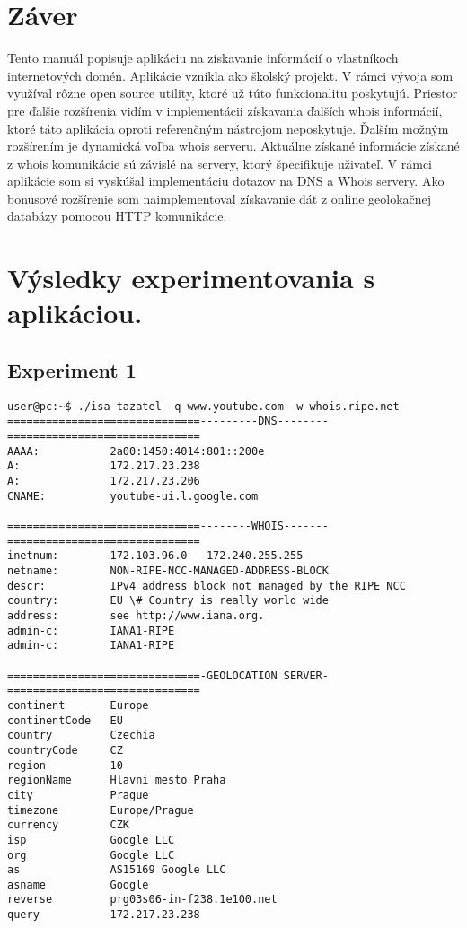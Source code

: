 \documentclass[a4paper, 11pt]{article}
\begin{document}
\section{Záver}
Tento manuál popisuje aplikáciu na získavanie informácií o vlastníkoch internetových domén. Aplikácie vznikla ako školský projekt. V rámci vývoja som využíval rôzne open source utility, ktoré už túto funkcionalitu poskytujú. Priestor pre ďalšie rozšírenia vidím v implementácii získavania ďalších whois informácií, ktoré táto aplikácia oproti referenčným nástrojom neposkytuje. Ďalším možným rozšírením je dynamická voľba whois serveru. Aktuálne získané informácie získané z whois komunikácie sú závislé na servery, ktorý špecifikuje uživateľ. V rámci aplikácie som si vyskúšal implementáciu dotazov na DNS a Whois servery. Ako bonusové rozšírenie som naimplementoval získavanie dát z online geolokačnej databázy pomocou HTTP komunikácie. 

\newpage



\newpage
\appendix
\section{Výsledky experimentovania s aplikáciou.}
\subsection{Experiment 1}\label{experiment_1}
\begin{lstlisting}[caption={Výsledok dotazu nad doménov \textbf{www.youtube.com}.},captionpos=b, label={test_app_1}]
user@pc:~$ ./isa-tazatel -q www.youtube.com -w whois.ripe.net
==============================---------DNS--------==============================
AAAA:           2a00:1450:4014:801::200e
A:              172.217.23.238
A:              172.217.23.206
CNAME:          youtube-ui.l.google.com

==============================--------WHOIS-------==============================
inetnum:        172.103.96.0 - 172.240.255.255
netname:        NON-RIPE-NCC-MANAGED-ADDRESS-BLOCK
descr:          IPv4 address block not managed by the RIPE NCC
country:        EU \# Country is really world wide
address:        see http://www.iana.org.
admin-c:        IANA1-RIPE
admin-c:        IANA1-RIPE

==============================-GEOLOCATION SERVER-==============================
continent       Europe
continentCode   EU
country         Czechia
countryCode     CZ
region          10
regionName      Hlavni mesto Praha
city            Prague
timezone        Europe/Prague
currency        CZK
isp             Google LLC
org             Google LLC
as              AS15169 Google LLC
asname          Google
reverse         prg03s06-in-f238.1e100.net
query           172.217.23.238
\end{lstlisting}
\end{document}
